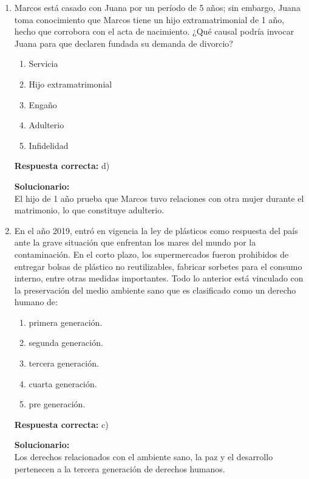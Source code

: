\begin{enumerate}
	
	\item Marcos está casado con Juana por un período de 5 años; sin embargo, Juana toma conocimiento que Marcos tiene un hijo extramatrimonial de 1 año, hecho que corrobora con el acta de nacimiento. ¿Qué causal podría invocar Juana para que declaren fundada su demanda de divorcio?
	\begin{enumerate}[label=\alph*)]
		\item Servicia
		\item Hijo extramatrimonial
		\item Engaño
		\item Adulterio
		\item Infidelidad
	\end{enumerate}
	\textbf{Respuesta correcta:} d)
	
	\vspace{2mm}
	\textbf{Solucionario:}\\
	El hijo de 1 año prueba que Marcos tuvo relaciones con otra mujer durante el matrimonio, lo que constituye adulterio.
	
	\vspace{6mm}
	
	\item En el año 2019, entró en vigencia la ley de plásticos como respuesta del país ante la grave situación que enfrentan los mares del mundo por la contaminación. En el corto plazo, los supermercados fueron prohibidos de entregar bolsas de plástico no reutilizables, fabricar sorbetes para el consumo interno, entre otras medidas importantes. Todo lo anterior está vinculado con la preservación del medio ambiente sano que es clasificado como un derecho humano de:
	\begin{enumerate}[label=\alph*)]
		\item primera generación.
		\item segunda generación.
		\item tercera generación.
		\item cuarta generación.
		\item pre generación.
	\end{enumerate}
	\textbf{Respuesta correcta:} c)
	
	\vspace{2mm}
	\textbf{Solucionario:}\\
	Los derechos relacionados con el ambiente sano, la paz y el desarrollo pertenecen a la tercera generación de derechos humanos.
	
	\vspace{6mm}
	
\end{enumerate}

